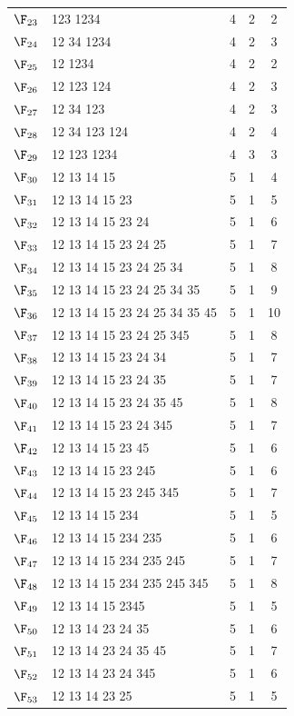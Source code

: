 {\begin{longtable}{c p{7cm} c c c}
$\F_{23}$ & 123 1234 & 4 & 2 & 2 \\
$\F_{24}$ & 12 34 1234 & 4 & 2 & 3 \\
$\F_{25}$ & 12 1234 & 4 & 2 & 2 \\
$\F_{26}$ & 12 123 124 & 4 & 2 & 3 \\
$\F_{27}$ & 12 34 123 & 4 & 2 & 3 \\
$\F_{28}$ & 12 34 123 124 & 4 & 2 & 4 \\
\midrule
$\F_{29}$ & 12 123 1234 & 4 & 3 & 3 \\
\midrule
$\F_{30}$ & 12 13 14 15 & 5 & 1 & 4 \\
$\F_{31}$ & 12 13 14 15 23 & 5 & 1 & 5 \\
$\F_{32}$ & 12 13 14 15 23 24 & 5 & 1 & 6 \\
$\F_{33}$ & 12 13 14 15 23 24 25 & 5 & 1 & 7 \\
$\F_{34}$ & 12 13 14 15 23 24 25 34 & 5 & 1 & 8 \\
$\F_{35}$ & 12 13 14 15 23 24 25 34 35 & 5 & 1 & 9 \\
$\F_{36}$ & 12 13 14 15 23 24 25 34 35 45 & 5 & 1 & 10 \\
$\F_{37}$ & 12 13 14 15 23 24 25 345 & 5 & 1 & 8 \\
$\F_{38}$ & 12 13 14 15 23 24 34 & 5 & 1 & 7 \\
$\F_{39}$ & 12 13 14 15 23 24 35 & 5 & 1 & 7 \\
$\F_{40}$ & 12 13 14 15 23 24 35 45 & 5 & 1 & 8 \\
$\F_{41}$ & 12 13 14 15 23 24 345 & 5 & 1 & 7 \\
$\F_{42}$ & 12 13 14 15 23 45 & 5 & 1 & 6 \\
$\F_{43}$ & 12 13 14 15 23 245 & 5 & 1 & 6 \\
$\F_{44}$ & 12 13 14 15 23 245 345 & 5 & 1 & 7 \\
$\F_{45}$ & 12 13 14 15 234 & 5 & 1 & 5 \\
$\F_{46}$ & 12 13 14 15 234 235 & 5 & 1 & 6 \\
$\F_{47}$ & 12 13 14 15 234 235 245 & 5 & 1 & 7 \\
$\F_{48}$ & 12 13 14 15 234 235 245 345 & 5 & 1 & 8 \\
$\F_{49}$ & 12 13 14 15 2345 & 5 & 1 & 5 \\
$\F_{50}$ & 12 13 14 23 24 35 & 5 & 1 & 6 \\
$\F_{51}$ & 12 13 14 23 24 35 45 & 5 & 1 & 7 \\
$\F_{52}$ & 12 13 14 23 24 345 & 5 & 1 & 6 \\
$\F_{53}$ & 12 13 14 23 25 & 5 & 1 & 5 \\

\end{longtable}}

